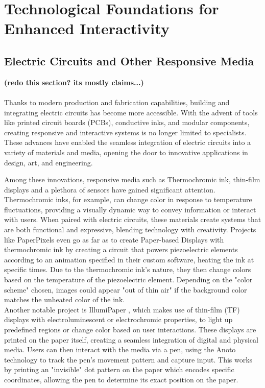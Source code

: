 \section{Technological Foundations for Enhanced Interactivity}
\subsection{Electric Circuits and Other Responsive Media}

\textbf{(redo this section? its mostly claims...)}\\\\

Thanks to modern production and fabrication capabilities, building and integrating electric circuits has become more accessible. With the advent of tools like printed circuit boards (PCBs), conductive inks, and modular components, creating responsive and interactive systems is no longer limited to specialists. These advances have enabled the seamless integration of electric circuits into a variety of materials and media, opening the door to innovative applications in design, art, and engineering.

Among these innovations, responsive media such as Thermochromic ink, thin-film displays and a plethora of sensors have gained significant attention. Thermochromic inks, for example, can change color in response to temperature fluctuations, providing a visually dynamic way to convey information or interact with users. When paired with electric circuits, these materials create systems that are both functional and expressive, blending technology with creativity.
Projects like PaperPixels \cite{paperpixels} even go as far as to create Paper-based Displays with thermochromic ink by creating a circuit that powers piezoelectric elements according to an animation specified in their custom software, heating the ink at specific times. Due to the thermochromic ink's nature, they then change colors based on the temperature of the piezoelectric element. Depending on the "color scheme" chosen, images could appear "out of thin air" if the background color matches the unheated color of the ink.\\


Another notable project is IllumiPaper \cite{illumipaper}, which makes use of thin-film (TF) displays with electroluminescent or electrochromic properties, to light up predefined regions or change color based on user interactions. These displays are printed on the paper itself, creating a seamless integration of digital and physical media. Users can then interact with the media via a pen, using the Anoto technology to track the pen's movement pattern and capture input. This works by printing an "invisible" dot pattern on the paper which encodes specific coordinates, allowing the pen to determine its exact position on the paper.\\

